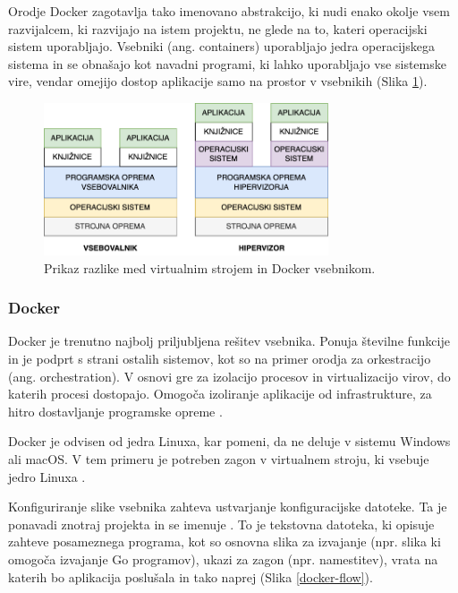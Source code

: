 \documentclass[a4paper, 12pt]{book}
\begin{document}
Orodje Docker zagotavlja tako imenovano abstrakcijo, ki nudi enako okolje vsem razvijalcem, ki razvijajo na istem projektu, ne glede na to, kateri operacijski sistem uporabljajo. Vsebniki (ang. containers) uporabljajo jedra operacijskega sistema in se obnašajo kot navadni programi, ki lahko uporabljajo vse sistemske vire, vendar omejijo dostop aplikacije samo na prostor v vsebnikih (Slika \ref{docker-vs-vm}). \clearpage

\begin{figure}[h]
\begin{center}
\includegraphics[width=0.75\textwidth]{slike/docker-vs-vm.png}
\end{center}
\caption{ Prikaz razlike med virtualnim strojem in Docker vsebnikom. }
\label{docker-vs-vm}
\end{figure}

\subsubsection{Docker}
\label{docker-section}
Docker je trenutno najbolj priljubljena rešitev vsebnika. Ponuja številne funkcije in je podprt s strani ostalih sistemov, kot so na primer orodja za orkestracijo (ang. orchestration). V osnovi gre za izolacijo procesov in virtualizacijo virov, do katerih procesi dostopajo. Omogoča izoliranje aplikacije od infrastrukture, za hitro dostavljanje programske opreme \cite{linuxcontainers}. 

Docker je odvisen od jedra Linuxa, kar pomeni, da ne deluje v sistemu Windows ali macOS. V tem primeru je potreben zagon v virtualnem stroju, ki vsebuje jedro Linuxa \cite{docker-in-action}.

Konfiguriranje slike vsebnika zahteva ustvarjanje konfiguracijske datoteke. Ta je ponavadi znotraj projekta in se imenuje . To je tekstovna datoteka, ki opisuje zahteve posameznega programa, kot so osnovna slika za izvajanje (npr. slika ki omogoča izvajanje Go programov), ukazi za zagon (npr. namestitev), vrata na katerih bo aplikacija poslušala in tako naprej (Slika \ref{docker-flow}).
\end{document}
